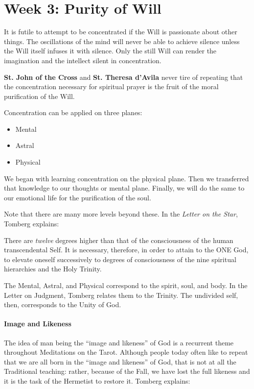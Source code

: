 \section{Week 3: Purity of Will}

\begin{quotationx}
It is futile to attempt to be concentrated if the Will is passionate about other things. The oscillations of the mind
will never be able to achieve silence unless the Will itself infuses it with silence. Only the still Will can render
the imagination and the intellect silent in concentration.

\textbf{St. John of the Cross} and \textbf{St. Theresa d'Avila} never tire of repeating that the
concentration necessary for spiritual prayer is the fruit of the moral purification of the Will. 

\end{quotationx}

Concentration can be applied on three planes:

\begin{itemize}
\item Mental 
\item Astral 
\item Physical 
\end{itemize}
We began with learning concentration on the physical plane. Then we transferred that knowledge to our thoughts or mental
plane. Finally, we will do the same to our emotional life for the purification of the soul.

Note that there are many more levels beyond these. In the \emph{Letter on the Star}, Tomberg explains:

\begin{quotationx}
There are \emph{twelve} degrees higher than that of the consciousness of the human transcendental Self. It is necessary,
therefore, in order to attain to the ONE God, to elevate oneself successively to degrees of consciousness of the nine
spiritual hierarchies and the Holy Trinity. 

\end{quotationx}
The Mental, Astral, and Physical correspond to the spirit, soul, and body. In the Letter on Judgment, Tomberg relates
them to the Trinity. The undivided self, then, corresponds to the Unity of God.

\paragraph{Image and Likeness}
The idea of man being the “image and likeness” of God is a recurrent theme throughout Meditations on the Tarot. Although
people today often like to repeat that we are all born in the “image and likeness” of God, that is not at all the
Traditional teaching: rather, because of the Fall, we have lost the full likeness and it is the task of the Hermetist
to restore it. Tomberg explains:

